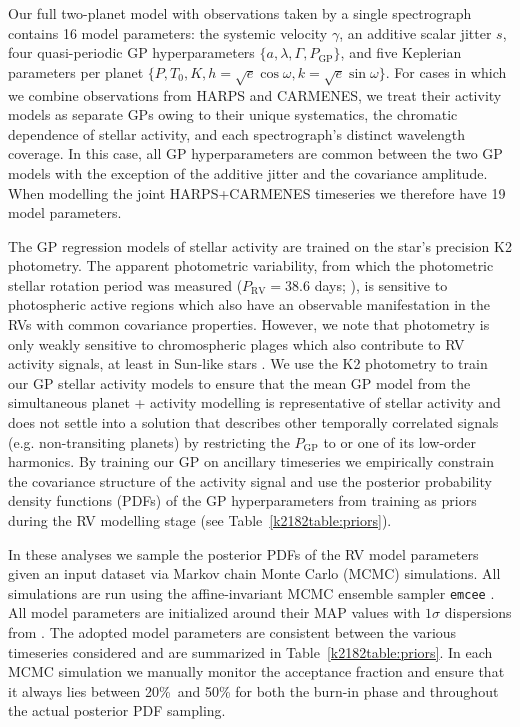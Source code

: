 Our full two-planet model with observations taken by a single spectrograph contains 16 model parameters: the systemic
velocity $\gamma$, an additive scalar jitter $s$, four quasi-periodic GP hyperparameters
$\{a, \lambda, \Gamma, P_{\text{GP}}\}$, and five Keplerian parameters per planet
$\{P, T_0, K, h=\sqrt{e}\cos{\omega}, k=\sqrt{e}\sin{\omega} \}$. For cases in which we combine observations from
HARPS and CARMENES, we treat their activity models as separate GPs \citep[e.g.][]{grunblatt15}
owing to their unique systematics, the chromatic dependence of stellar activity, and each spectrograph's distinct
wavelength coverage. In this case,
all GP hyperparameters are common between the two GP models with the exception of the additive jitter and the covariance
amplitude. When modelling the joint HARPS+CARMENES timeseries we therefore have 19 model parameters.

The GP regression models of stellar activity are trained on the star's precision K2 photometry. The
apparent photometric variability, from which the photometric stellar rotation period was measured
($P_{\text{RV}}=38.6$ days; ), is sensitive
to photospheric active regions which also have an observable manifestation in the RVs with common covariance
properties. However, we note that photometry is only weakly sensitive to chromospheric plages which also
contribute to RV activity signals, at least in Sun-like stars \citep{haywood16}. We
use the K2 photometry to train our GP stellar activity models to ensure that the
mean GP model from the simultaneous planet + activity modelling is representative of stellar
activity and does not settle into a solution that describes other temporally correlated signals (e.g.
non-transiting planets) by restricting the $P_{\text{GP}}$ to \prot{} or one of its low-order
harmonics. By training our GP on ancillary timeseries we empirically constrain the covariance structure of the
activity signal and use the posterior probability density functions (PDFs)
of the GP hyperparameters from training as priors during
the RV modelling stage (see Table~\ref{k2182table:priors}).





In these analyses we sample the posterior PDFs
of the RV model parameters given an input dataset via Markov chain Monte Carlo (MCMC) simulations.
All simulations are run using the affine-invariant MCMC ensemble sampler
\texttt{emcee} \citep{foremanmackey13}. All model parameters are initialized around their MAP values
with $1\sigma$ dispersions from . The adopted model parameters are consistent
between the various timeseries considered and are summarized in Table~\ref{k2182table:priors}. In each
MCMC simulation we manually monitor the acceptance fraction and ensure that it always lies between
20\%\ and 50\% for both the burn-in phase and throughout the actual posterior PDF sampling.

